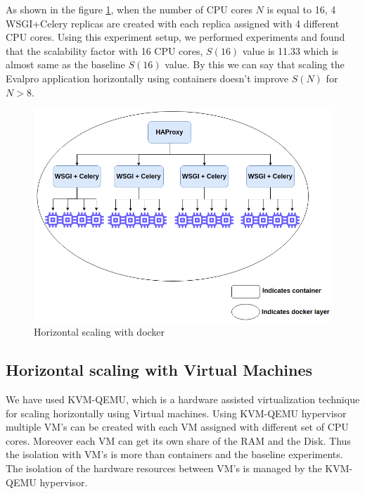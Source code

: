 \documentclass[sigconf]{acmart}
\begin{document}
As shown in the figure \ref{docker_swarm}, when the number of CPU cores $N$ is equal to 16, 4 WSGI+Celery replicas are created with each replica assigned with 4  different CPU cores. Using this experiment setup, we performed experiments and found that the scalability factor with 16 CPU cores, $S(16)$ value is 11.33 which is almost same as the baseline $S(16)$ value. By this we can say that scaling the Evalpro application horizontally using containers doesn't improve  $S(N)$ for $N>8$.
\begin{figure}[!htb]
  \centering
  \includegraphics[width=\linewidth]{Pictures/docker_swarm.png}
  \caption{Horizontal scaling with docker}
  \label{docker_swarm}
\end{figure}

\subsection{Horizontal scaling with Virtual Machines}
We have used KVM-QEMU, which is a hardware assisted virtualization technique for scaling horizontally using Virtual machines. Using KVM-QEMU hypervisor multiple VM's can be created with each VM assigned with different set of CPU cores. Moreover each VM can get its own share of the RAM and the Disk. Thus the isolation with VM's is more than containers and the baseline experiments. The isolation of the hardware resources between VM's is managed by the KVM-QEMU hypervisor.
\end{document}
